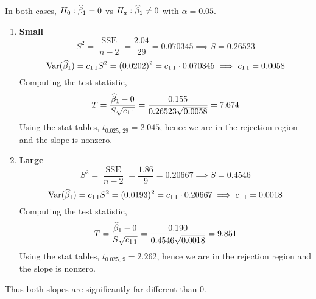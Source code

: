In both cases, $H_0 : \widehat{\beta}_1 = 0$ vs $H_a : \widehat{\beta}_1 \neq 0$ with $\alpha = 0.05$.
\begin{enumerate}[label=]
    \item \textbf{Small} $$S^2 = \frac{\operatorname{SSE}}{n-2} = \frac{2.04}{29} = 0.070345 \implies S = 0.26523$$
    $$\Var*{\bat_1} = c_{1\,1}S^2 = (0.0202)^2 = c_{1\,1} \cdot 0.070345 \implies c_{1\,1} = 0.0058$$
    Computing the test statistic, 
    $$T = \frac{\widehat{\beta}_1 - 0}{S\sqrt{c_{1\,1}}} = \frac{0.155}{0.26523 \sqrt{0.0058}} = 7.674$$
    Using the stat tables, $t_{0.025,\,29} = 2.045$, hence we are in the rejection region and the slope is nonzero.
    \item \textbf{Large} $$S^2 = \frac{\operatorname{SSE}}{n-2} = \frac{1.86}{9} = 0.20667 \implies S = 0.4546$$
    $$\Var*{\bat_1} = c_{1\,1}S^2 = (0.0193)^2 = c_{1\,1} \cdot 0.20667 \implies c_{1\,1} = 0.0018$$
    Computing the test statistic, 
    $$T = \frac{\widehat{\beta}_1 - 0}{S\sqrt{c_{1\,1}}} = \frac{0.190}{ 0.4546 \sqrt{0.0018}} = 9.851$$
    Using the stat tables, $t_{0.025,\,9} = 2.262$, hence we are in the rejection region and the slope is nonzero.
\end{enumerate}
Thus both slopes are significantly far different than 0.